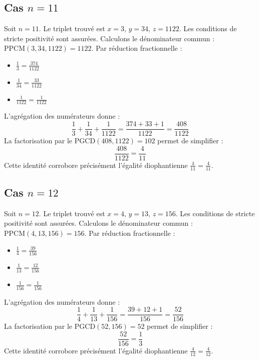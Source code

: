 \documentclass[11pt,a4paper]{article}
\begin{document}
\subsection{Cas $n = 11$}
Soit $n = 11$. Le triplet trouvé est $x = 3$, $y = 34$, $z = 1122$.
Les conditions de stricte positivité sont assurées.
Calculons le dénominateur commun : $\text{PPCM}(3, 34, 1122) = 1122$.
Par réduction fractionnelle :
\begin{itemize}
    \item $\frac{1}{3} = \frac{374}{1122}$
    \item $\frac{1}{34} = \frac{33}{1122}$
    \item $\frac{1}{1122} = \frac{1}{1122}$
\end{itemize}
L'agrégation des numérateurs donne :
$$ \frac{1}{3} + \frac{1}{34} + \frac{1}{1122} = \frac{374 + 33 + 1}{1122} = \frac{408}{1122} $$
La factorisation par le $\text{PGCD}(408, 1122) = 102$ permet de simplifier :
$$ \frac{408}{1122} = \frac{4}{11} $$
Cette identité corrobore précisément l'égalité diophantienne $\frac{4}{11} = \frac{4}{11}$.

\subsection{Cas $n = 12$}
Soit $n = 12$. Le triplet trouvé est $x = 4$, $y = 13$, $z = 156$.
Les conditions de stricte positivité sont assurées.
Calculons le dénominateur commun : $\text{PPCM}(4, 13, 156) = 156$.
Par réduction fractionnelle :
\begin{itemize}
    \item $\frac{1}{4} = \frac{39}{156}$
    \item $\frac{1}{13} = \frac{12}{156}$
    \item $\frac{1}{156} = \frac{1}{156}$
\end{itemize}
L'agrégation des numérateurs donne :
$$ \frac{1}{4} + \frac{1}{13} + \frac{1}{156} = \frac{39 + 12 + 1}{156} = \frac{52}{156} $$
La factorisation par le $\text{PGCD}(52, 156) = 52$ permet de simplifier :
$$ \frac{52}{156} = \frac{1}{3} $$
Cette identité corrobore précisément l'égalité diophantienne $\frac{4}{12} = \frac{4}{12}$.
\end{document}
